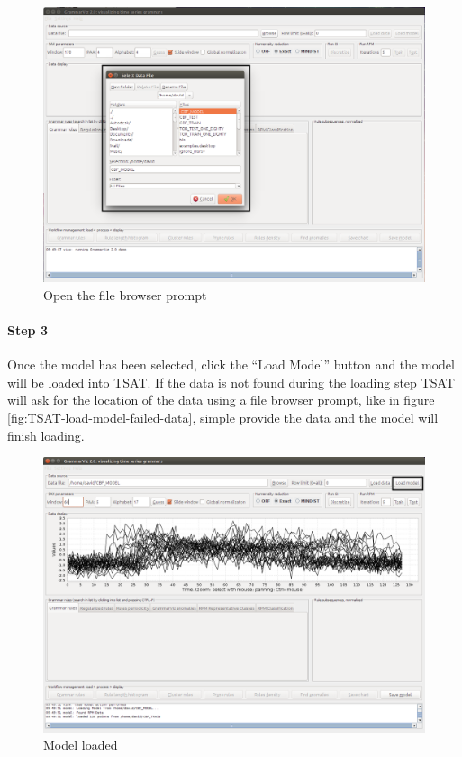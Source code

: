 \documentclass[letterpaper, 12pt]{article}
\begin{document}
\begin{figure}[H]
  \includegraphics[width=\textwidth]{TSAT-load-model-step-2}
  \caption{Open the file browser prompt}
  \label{fig:TSAT-load-model-step-2}
\end{figure}

\newpage
\paragraph{Step 3}
Once the model has been selected, click the ``Load Model'' button and the model will be loaded into TSAT. If the data is not found during the loading step TSAT will ask for the location of the data using a file browser prompt, like in figure \ref{fig:TSAT-load-model-failed-data}, simple provide the data and the model will finish loading. 

\begin{figure}[H]
  \includegraphics[width=\textwidth]{TSAT-load-model-step-3}
  \caption{Model loaded}
  \label{fig:TSAT-load-model-step-3}
\end{figure}
\end{document}

